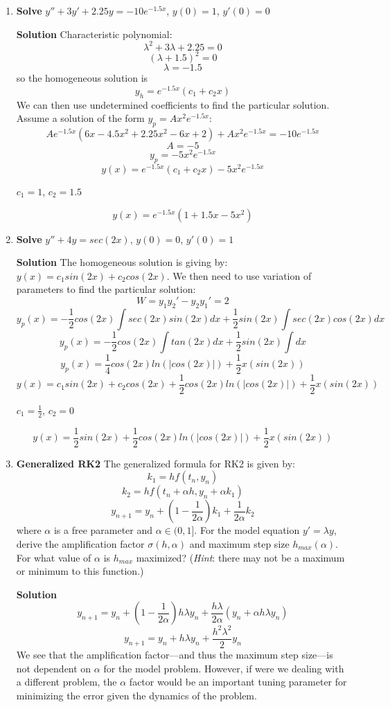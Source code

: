\documentclass[letterpaper, fontsize=11pt]{scrartcl} %
\numberwithin{equation}{section} %
\numberwithin{figure}{section} %
\numberwithin{table}{section} %
\begin{document}
\begin{enumerate}
\item \textbf{Solve} $y'' + 3y' + 2.25y = -10e^{-1.5x}$, $y(0) = 1$, $y'(0) = 0$ \par
\textbf{Solution} \newline
Characteristic polynomial:
$$\lambda^2 + 3\lambda + 2.25 = 0 $$
$$(\lambda + 1.5)^2 = 0$$
$$\lambda = -1.5$$
so the homogeneous solution is 
$$ y_h = e^{-1.5x}(c_1+c_2x)$$
We can then use undetermined coefficients to find the particular solution. Assume a solution of the form $y_p = Ax^2e^{-1.5x}$:
$$Ae^{-1.5x}(6x - 4.5x^2 + 2.25 x^2 - 6x + 2) + Ax^2e^{-1.5x} = -10e^{-1.5x}$$
$$A = -5$$
$$y_p = -5x^2e^{-1.5x}$$
$$y(x) = e^{-1.5x}(c_1+c_2x) -5x^2e^{-1.5x}$$
\begin{center} $c_1 = 1$, $c_2 = 1.5$ \end{center}
$$y(x) = e^{-1.5x}(1 + 1.5x -5x^2)$$

\item \textbf{Solve} $y'' + 4y = sec(2x) $, $y(0) = 0$, $y'(0) = 1$\par
\textbf{Solution} \newline
The homogeneous solution is giving by: $y(x) = c_1sin(2x) + c_2cos(2x)$. We then need to use variation of parameters to find the particular solution: 
$$W = y_1y_2' - y_2y_1' = 2$$
$$y_p(x) = -\frac{1}{2}cos(2x) \int sec(2x)sin(2x)dx + \frac{1}{2}sin(2x) \int sec(2x)cos(2x)dx$$
$$y_p(x) = -\frac{1}{2}cos(2x) \int tan(2x)dx + \frac{1}{2}sin(2x) \int dx$$
$$y_p(x) = \frac{1}{4}cos(2x) ln(|cos(2x)|)+ \frac{1}{2}x(sin(2x)) $$
$$y(x) = c_1sin(2x) + c_2cos(2x) + \frac{1}{2}cos(2x) ln(|cos(2x)|)+ \frac{1}{2}x(sin(2x)) $$
\begin{center} $c_1 = \frac{1}{2}$, $c_2 = 0$ \newline \end{center}
$$y(x) = \frac{1}{2}sin(2x) + \frac{1}{2}cos(2x) ln(|cos(2x)|)+ \frac{1}{2}x(sin(2x)) $$


\item \textbf{Generalized RK2} The generalized formula for RK2 is given by:
$$k_1 = hf(t_n,y_n)$$
$$k_2 = hf(t_n + \alpha h, y_n + \alpha k_1)$$
$$y_{n+1} = y_n + (1 - \frac{1}{2\alpha})k_1 + \frac{1}{2\alpha}k_2$$
where $\alpha$ is a free parameter and $\alpha \in (0,1]$. For the model equation $y' = \lambda y$, derive the amplification factor $\sigma (h,\alpha)$ and maximum step size $h_{max} (\alpha)$. For what value of $\alpha$ is $h_{max}$ maximized? (\textit{Hint}: there may not be a maximum or minimum to this function.) \par
\textbf{Solution} 
$$y_{n+1} = y_n + (1-\frac{1}{2\alpha})h\lambda y_n + \frac{h\lambda}{2\alpha}(y_n + \alpha h \lambda y_n)    $$
$$y_{n+1} = y_n + h\lambda y_n + \frac{h^2\lambda^2}{2}y_n $$
We see that the amplification factor---and thus the maximum step size---is not dependent on $\alpha$ for the model problem. However, if were we dealing with a different problem, the $\alpha$ factor would be an important tuning parameter for minimizing the error given the dynamics of the problem. 


\end{enumerate}
\end{document}
